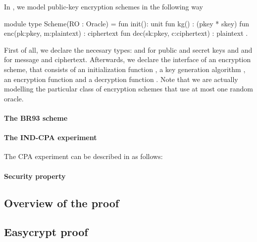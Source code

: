 In \EC, we model public-key encryption schemes in the following way
\begin{easycrypt}[label={lst:enc_scheme}]{}
 module type Scheme(RO : Oracle) = {
  fun init(): unit 
  fun kg() : (pkey * skey)
  fun enc(pk:pkey, m:plaintext) : ciphertext
  fun dec(sk:pkey, c:ciphertext) : plaintext
 }.
\end{easycrypt}
First of all, we declare the necesary types:  and 
for public and secret keys and  and  for
message and ciphertext. Afterwards, we declare the interface of an
encryption scheme, that consists of an initialization function
, a key generation algorithm , an encryption function
 and a decryption function . Note that we are actually
modelling the particular class of encryption schemes that use at most
one random oracle.

\paragraph{The BR93 scheme}



\paragraph{The \textsf{IND-CPA} experiment}
The CPA experiment can be described in \EC as follows:

\begin{easycrypt}[label={lst:enc_scheme}]{}

\end{easycrypt}


\paragraph{Security property}
\subsection{Overview of the proof}

\subsection{Easycrypt proof}


